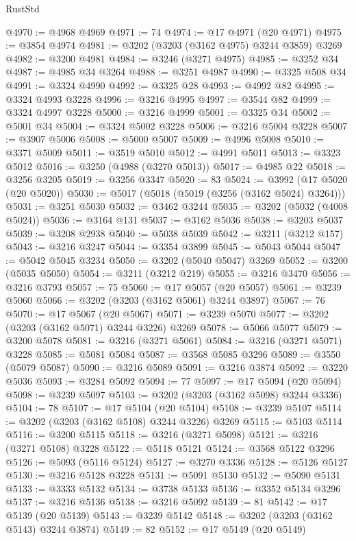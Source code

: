 \begin{lexlean}{RustStd}
\begin{coremodule}
@4970 := @4968 @4969
@4971 := 74
@4974 := @17 @4971 (@20 @4971)
@4975 := @3854 @4974
@4981 := @3202 (@3203 (@3162 @4975) @3244 @3859) @3269
@4982 := @3200 @4981
@4984 := @3246 (@3271 @4975)
@4985 := @3252 @34
@4987 := @4985 @34 @3264
@4988 := @3251 @4987
@4990 := @3325 @508 @34
@4991 := @3324 @4990
@4992 := @3325 @28
@4993 := @4992 @82
@4995 := @3324 @4993 @3228
@4996 := @3216 @4995
@4997 := @3544 @82
@4999 := @3324 @4997 @3228
@5000 := @3216 @4999
@5001 := @3325 @34
@5002 := @5001 @34
@5004 := @3324 @5002 @3228
@5006 := @3216 @5004 @3228
@5007 := @3907 @5006
@5008 := @5000 @5007
@5009 := @4996 @5008
@5010 := @3371 @5009
@5011 := @3519 @5010
@5012 := @4991 @5011
@5013 := @3323 @5012
@5016 := @3250 (@4988 (@3270 @5013))
@5017 := @4985 @22
@5018 := @3256 @3205
@5019 := @3256 @3347
@5020 := 83
@5024 := @3992 (@17 @5020 (@20 @5020))
@5030 := @5017 (@5018 (@5019 (@3256 (@3162 @5024) @3264)))
@5031 := @3251 @5030
@5032 := @3462 @3244
@5035 := @3202 (@5032 (@4008 @5024))
@5036 := @3164 @131
@5037 := @3162 @5036
@5038 := @3203 @5037
@5039 := @3208 @2938
@5040 := @5038 @5039
@5042 := @3211 (@3212 @157)
@5043 := @3216 @3247
@5044 := @3354 @3899
@5045 := @5043 @5044
@5047 := @5042 @5045 @3234
@5050 := @3202 (@5040 @5047) @3269
@5052 := @3200 (@5035 @5050)
@5054 := @3211 (@3212 @219)
@5055 := @3216 @3470
@5056 := @3216 @3793
@5057 := 75
@5060 := @17 @5057 (@20 @5057)
@5061 := @3239 @5060
@5066 := @3202 (@3203 (@3162 @5061) @3244 @3897)
@5067 := 76
@5070 := @17 @5067 (@20 @5067)
@5071 := @3239 @5070
@5077 := @3202 (@3203 (@3162 @5071) @3244 @3226) @3269
@5078 := @5066 @5077
@5079 := @3200 @5078
@5081 := @3216 (@3271 @5061)
@5084 := @3216 (@3271 @5071) @3228
@5085 := @5081 @5084
@5087 := @3568 @5085 @3296
@5089 := @3550 (@5079 @5087)
@5090 := @3216 @5089
@5091 := @3216 @3874
@5092 := @3220 @5036
@5093 := @3284 @5092
@5094 := 77
@5097 := @17 @5094 (@20 @5094)
@5098 := @3239 @5097
@5103 := @3202 (@3203 (@3162 @5098) @3244 @3336)
@5104 := 78
@5107 := @17 @5104 (@20 @5104)
@5108 := @3239 @5107
@5114 := @3202 (@3203 (@3162 @5108) @3244 @3226) @3269
@5115 := @5103 @5114
@5116 := @3200 @5115
@5118 := @3216 (@3271 @5098)
@5121 := @3216 (@3271 @5108) @3228
@5122 := @5118 @5121
@5124 := @3568 @5122 @3296
@5126 := @5093 (@5116 @5124)
@5127 := @3270 @3336
@5128 := @5126 @5127
@5130 := @3216 @5128 @3228
@5131 := @5091 @5130
@5132 := @5090 @5131
@5133 := @3333 @5132
@5134 := @3738 @5133
@5136 := @3352 @5134 @3296
@5137 := @3216 @5136
@5138 := @3216 @5092
@5139 := 81
@5142 := @17 @5139 (@20 @5139)
@5143 := @3239 @5142
@5148 := @3202 (@3203 (@3162 @5143) @3244 @3874)
@5149 := 82
@5152 := @17 @5149 (@20 @5149)

\end{coremodule}
\end{lexlean}
